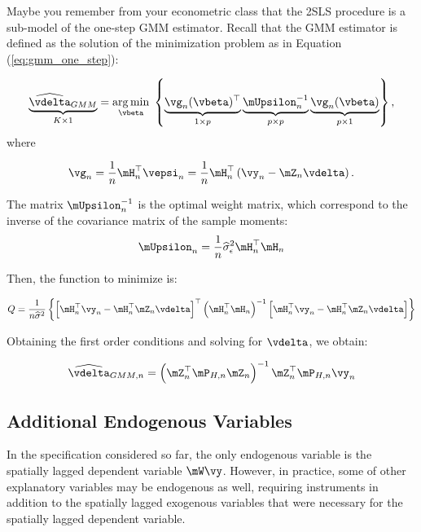 \documentclass[english,12pt]{book}\usepackage[]{graphicx}\usepackage[]{xcolor}
\begin{document}
Maybe you remember from  your econometric class that the 2SLS procedure is a sub-model of the one-step GMM estimator. Recall that the GMM estimator is defined as the solution of the minimization problem as in Equation (\ref{eq:gmm_one_step}):

\begin{equation*}
	\underbrace{\widehat{\vdelta}_{GMM}}_{K\times 1} = \underset{\vbeta}{\arg\min}\; \left\lbrace \underbrace{\vg_n(\vbeta)^\top}_{1\times p}\underbrace{\mUpsilon_n^{-1}}_{p\times p}\underbrace{\vg_n(\vbeta)}_{p\times 1}\right\rbrace,
\end{equation*}
%
where 

\begin{equation*}
\vg_n = \frac{1}{n}\mH^\top_n\vepsi_n= \frac{1}{n}\mH^\top_n\left(\vy_n - \mZ_n\vdelta\right).
\end{equation*}

The matrix $\mUpsilon_n^{-1}$ is the optimal weight matrix, which correspond to the inverse of the covariance matrix of the sample moments: 
\begin{equation*}
	\mUpsilon_n = \frac{1}{n}\widehat{\sigma}^2_{\epsilon}\mH^\top_n\mH_n
\end{equation*}

Then, the function to minimize is:

\begin{equation*}
		Q  = \frac{1}{n\widehat{\sigma}^2}\left\lbrace \left[\mH^\top_n\vy_n - \mH^\top_n\mZ_n\vdelta\right]^\top\left(\mH^\top_n\mH_n\right)^{-1}\left[\mH^\top_n\vy_n - \mH^\top_n\mZ_n\vdelta\right]\right\rbrace 
\end{equation*}

Obtaining the first order conditions and solving for $\vdelta$, we obtain:

\begin{equation}
  \widehat{\vdelta}_{GMM,n} = \left(\mZ^\top_n\mP_{H,n}\mZ_n\right)^{-1}\mZ^\top_n\mP_{H, n}\vy_n
\end{equation}



\subsection{Additional Endogenous Variables}

In the specification considered so far, the only endogenous variable is the spatially lagged dependent variable $\mW\vy$. However, in practice, some of other explanatory variables may be endogenous as well, requiring instruments in addition to the spatially lagged exogenous variables that were necessary for the spatially lagged dependent variable.
\end{document}
